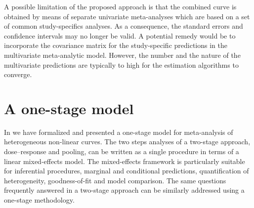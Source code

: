 \documentclass[11pt,a4paper,twoside,openany]{book}\usepackage{knitr}
\begin{document}
{A possible limitation of the proposed approach is that the combined curve is obtained by means of separate univariate meta-analyses which are based on a set of common study-specifics analyses. As a consequence, the standard errors and confidence intervals may no longer be valid. A potential remedy would be to incorporate the covariance matrix for the study-specific predictions in the multivariate meta-analytic model. However, the number and the nature of the multivariate predictions are typically to high for the estimation algorithms to converge.


\section{A one-stage model}

In  we have formalized and presented a one-stage model for meta-analysis of heterogeneous non-linear curves. The two steps analyses of a two-stage approach, dose--response and pooling, can be written as a single procedure in terms of a linear mixed-effects model. The mixed-effects framework is particularly suitable for inferential procedures, marginal and conditional predictions, quantification of heterogeneity, goodness-of-fit and model comparison. The same questions frequently answered in a two-stage approach can be similarly addressed using a one-stage methodology. 

}
\end{document}

